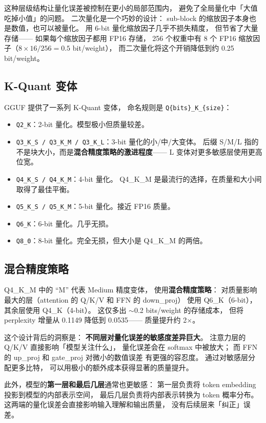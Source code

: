 这种层级结构让量化误差被控制在更小的局部范围内，
避免了全局量化中「大值吃掉小值」的问题。
二次量化是一个巧妙的设计：
sub-block 的缩放因子本身也是数值，也可以被量化。
用 6-bit 量化缩放因子几乎不损失精度，
但节省了大量存储——
如果每个缩放因子都用 FP16 存储，
256 个权重中有 8 个 FP16 缩放因子（$8 \times 16 / 256 = 0.5$ bit/weight），
而二次量化将这个开销降低到约 0.25 bit/weight。

\subsection{K-Quant 变体}

GGUF 提供了一系列 K-Quant 变体，
命名规则是 \texttt{Q\{bits\}\_K\_\{size\}}：
\begin{itemize}[noitemsep]
  \item \texttt{Q2\_K}：2-bit 量化。模型极小但质量较差。
  \item \texttt{Q3\_K\_S / Q3\_K\_M / Q3\_K\_L}：3-bit 量化的小/中/大变体。
        后缀 S/M/L 指的不是块大小，而是\textbf{混合精度策略的激进程度}——
        L 变体对更多敏感层使用更高位宽。
  \item \texttt{Q4\_K\_S / Q4\_K\_M}：4-bit 量化。
        Q4\_K\_M 是最流行的选择，在质量和大小间取得了最佳平衡。
  \item \texttt{Q5\_K\_S / Q5\_K\_M}：5-bit 量化。接近 FP16 质量。
  \item \texttt{Q6\_K}：6-bit 量化。几乎无损。
  \item \texttt{Q8\_0}：8-bit 量化。完全无损，但大小是 Q4\_K\_M 的两倍。
\end{itemize}

\subsection{混合精度策略}

Q4\_K\_M 中的 ``M'' 代表 Medium 精度变体，
使用\textbf{混合精度策略}：
对质量影响最大的层（attention 的 Q/K/V 和 FFN 的 down\_proj）
使用 Q6\_K（6-bit），
其余层使用 Q4\_K（4-bit）。
这仅多出 $\sim$0.2 bits/weight 的存储成本，
但将 perplexity 增量从 0.1149 降低到 0.0535——
质量提升约 2$\times$。

这个设计背后的洞察是：
\textbf{不同层对量化误差的敏感度差异巨大}。
注意力层的 Q/K/V 直接影响「模型关注什么」，
量化误差会在 softmax 中被放大；
而 FFN 的 up\_proj 和 gate\_proj 对微小的数值误差
有更强的容忍度。
通过对敏感层分配更多比特，
可以用极小的额外成本获得显著的质量提升。

此外，模型的\textbf{第一层和最后几层}通常也更敏感：
第一层负责将 token embedding 投影到模型的内部表示空间，
最后几层负责将内部表示转换为 token 概率分布。
这两端的量化误差会直接影响输入理解和输出质量，
没有后续层来「纠正」误差。

